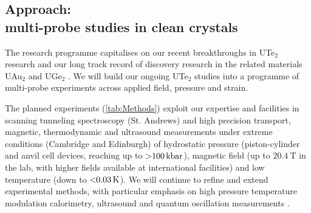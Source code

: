 










\subsection*{Approach: \\ multi-probe studies in clean crystals}
\noindent
The research programme capitalises on our recent breakthroughs in UTe$_2$ research \cite{eaton23,wu23,weinberger23} and our long track record of discovery research in the related materials UAu$_2$ \cite{oneill22} and UGe$_2$ \cite{saxena00}. We will build our ongoing UTe$_2$ studies into a programme of multi-probe experiments across applied field, pressure and strain.

The planned experiments (\autoref{tab:Methods}) exploit our expertise and facilities in scanning tunneling spectroscopy (St. Andrews) and high precision transport, magnetic, thermodynamic and ultrasound measurements under extreme conditions (Cambridge and Edinburgh) of hydrostatic pressure (piston-cylinder and anvil cell devices, reaching up to $\SI{>100}{\kilo\bar}$), magnetic field (up to $\SI{20.4}{\tesla}$ in the lab, with higher fields available at international facilities) and low temperature (down to $\SI{<0.03}{\kelvin}$). We will continue to refine and extend experimental methods, with particular emphasis on high pressure temperature modulation calorimetry, ultrasound and quantum oscillation measurements  .  %

